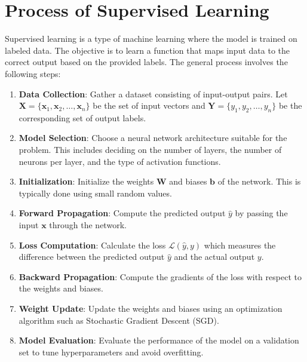 \documentclass{report}
\begin{document}
    \section{Process of Supervised Learning}
        Supervised learning is a type of machine learning where the model is trained on labeled data. The objective is to learn a function that maps input data to the correct output based on the provided labels. The general process involves the following steps:

        \begin{enumerate}
            \item \textbf{Data Collection}: Gather a dataset consisting of input-output pairs. Let \( \mathbf{X} = \{ \mathbf{x}_1, \mathbf{x}_2, \ldots, \mathbf{x}_n \} \) be the set of input vectors and \( \mathbf{Y} = \{ y_1, y_2, \ldots, y_n \} \) be the corresponding set of output labels.
            
            \item \textbf{Model Selection}: Choose a neural network architecture suitable for the problem. This includes deciding on the number of layers, the number of neurons per layer, and the type of activation functions.
            
            \item \textbf{Initialization}: Initialize the weights \( \mathbf{W} \) and biases \( \mathbf{b} \) of the network. This is typically done using small random values.
            
            \item \textbf{Forward Propagation}: Compute the predicted output \( \hat{y} \) by passing the input \( \mathbf{x} \) through the network.
            
            \item \textbf{Loss Computation}: Calculate the loss \( \mathcal{L}(\hat{y}, y) \) which measures the difference between the predicted output \( \hat{y} \) and the actual output \( y \).
            
            \item \textbf{Backward Propagation}: Compute the gradients of the loss with respect to the weights and biases.
            
            \item \textbf{Weight Update}: Update the weights and biases using an optimization algorithm such as Stochastic Gradient Descent (SGD).
            
            \item \textbf{Model Evaluation}: Evaluate the performance of the model on a validation set to tune hyperparameters and avoid overfitting.
        \end{enumerate}
\end{document}
